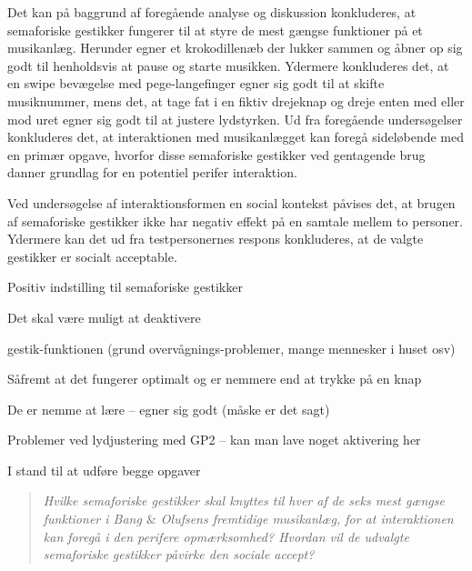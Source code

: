 Det kan på baggrund af foregående analyse og diskussion konkluderes, at semaforiske gestikker fungerer til at styre de mest gængse funktioner på et musikanlæg. Herunder egner et krokodillenæb der lukker sammen og åbner op sig godt til henholdsvis at pause og starte musikken. Ydermere konkluderes det, at en swipe bevægelse med pege-langefinger egner sig godt til at skifte musiknummer, mens det, at tage fat i en fiktiv drejeknap og dreje enten med eller mod uret egner sig godt til at justere lydstyrken. Ud fra foregående undersøgelser konkluderes det, at interaktionen med musikanlægget kan foregå sideløbende med en primær opgave, hvorfor disse semaforiske gestikker ved gentagende brug danner grundlag for en potentiel perifer interaktion. 

Ved undersøgelse af interaktionsformen en social kontekst påvises det, at brugen af semaforiske gestikker ikke har negativ effekt på en samtale mellem to personer. Ydermere kan det ud fra testpersonernes respons konkluderes, at de valgte gestikker er socialt acceptable. 

Positiv indstilling til semaforiske gestikker

Det skal være muligt at deaktivere 

gestik-funktionen (grund overvågnings-problemer, mange mennesker i huset osv) 

Såfremt at det fungerer optimalt og er nemmere end at trykke på en knap

De er nemme at lære – egner sig godt (måske er det sagt)

Problemer ved lydjustering med GP2 – kan man lave noget aktivering her 

I stand til at udføre begge opgaver



%
\begin{quotation}
	\noindent
	\textit{Hvilke semaforiske gestikker skal knyttes til hver af de seks mest gængse funktioner i Bang $\&$ Olufsens fremtidige musikanlæg, for at interaktionen kan foregå i den perifere opmærksomhed?\blankline
		Hvordan vil de udvalgte semaforiske gestikker påvirke den sociale accept?}\blankline
\end{quotation}
%